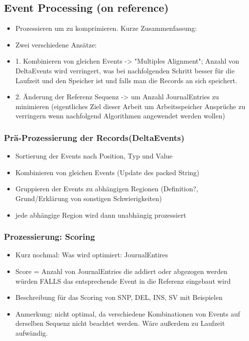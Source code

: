 \documentclass[11pt]{article}
\begin{document}
\subsection{Event Processing (on reference)}
\begin{itemize}
\item Prozessieren um zu komprimieren. Kurze Zusammenfassung:
\item Zwei verschiedene Ansätze:
\item 1. Kombinieren von gleichen Events -> "Multiples Alignment"; Anzahl von DeltaEvents wird verringert, was bei nachfolgenden Schritt besser für die Laufzeit und den Speicher ist und falls man die Records an sich speichert.
\item 2. Änderung der Referenz Sequenz -> um Anzahl JournalEntries zu minimieren (eigentliches Ziel dieser Arbeit um Arbeitsspeicher Ansprüche zu verringern wenn nachfolgend Algorithmen angewendet werden wollen)
\end{itemize}

\subsubsection{Prä-Prozessierung der Records(DeltaEvents)}
\begin{itemize}
\item Sortierung der Events nach Position, Typ und Value
\item Kombinieren von gleichen Events (Update des packed String)
\item Gruppieren der Events zu abhängigen Regionen (Definition?, Grund/Erklärung von sonstigen Schwierigkeiten)
\item jede abhängige Region wird dann unabhängig prozessiert
\end{itemize}

\subsubsection{Prozessierung: Scoring}
\begin{itemize}
\item Kurz nochmal: Was wird optimiert: JournalEntires
\item Score = Anzahl von JournalEntries die addiert oder abgezogen werden würden FALLS das entsprechende Event in die Referenz eingebaut wird
\item Beschreibung für das Scoring von SNP, DEL, INS, SV mit Beispielen
\item Anmerkung: nicht optimal, da verschiedene Kombinationen von Events auf derselben Sequenz nicht beachtet werden. Wäre außerdem zu Laufzeit aufwändig.
\end{itemize}
\end{document}

